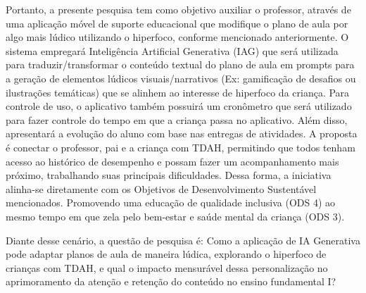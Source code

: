Portanto, a presente pesquisa tem como objetivo auxiliar o professor, através de uma aplicação móvel de suporte educacional que modifique o plano de aula por algo mais lúdico utilizando o hiperfoco, conforme mencionado anteriormente. O sistema empregará Inteligência Artificial Generativa (IAG) que será utilizada para traduzir/transformar o conteúdo textual do plano de aula em prompts para a geração de elementos lúdicos visuais/narrativos (Ex: gamificação de desafios ou ilustrações temáticas) que se alinhem ao interesse de hiperfoco da criança. Para controle de uso, o aplicativo também possuirá um cronômetro que será utilizado para fazer controle do tempo em que a criança passa no aplicativo. Além disso, apresentará a evolução do aluno com base nas entregas de atividades. A proposta é conectar o professor, pai e a criança com TDAH, permitindo que todos tenham acesso ao histórico de desempenho e possam fazer um acompanhamento mais próximo,  trabalhando suas principais dificuldades. Dessa forma, a iniciativa alinha-se diretamente com os Objetivos de Desenvolvimento Sustentável mencionados. Promovendo uma educação de qualidade inclusiva (ODS 4) ao mesmo tempo em que zela pelo bem-estar e saúde mental da criança (ODS 3). 

Diante desse cenário, a questão de pesquisa é: Como a aplicação de IA Generativa pode adaptar planos de aula de maneira lúdica, explorando o hiperfoco de crianças com TDAH, e qual o impacto mensurável dessa personalização no aprimoramento da atenção e retenção do conteúdo no ensino fundamental I?